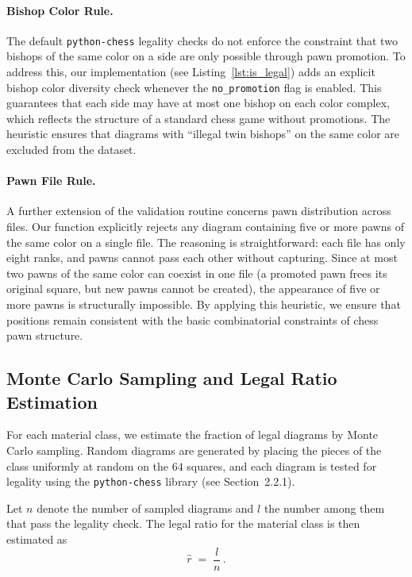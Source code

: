 \documentclass[12pt]{article}
\begin{document}
\paragraph{Bishop Color Rule.}
The default \texttt{python-chess} legality checks do not enforce the constraint that two bishops of the same color on a side are only possible through pawn promotion. 
To address this, our implementation (see Listing~\ref{lst:is_legal}) adds an explicit bishop color diversity check whenever the \texttt{no\_promotion} flag is enabled. 
This guarantees that each side may have at most one bishop on each color complex, which reflects the structure of a standard chess game without promotions. 
The heuristic ensures that diagrams with ``illegal twin bishops'' on the same color are excluded from the dataset.

\paragraph{Pawn File Rule.}
A further extension of the validation routine concerns pawn distribution across files. 
Our function explicitly rejects any diagram containing five or more pawns of the same color on a single file. 
The reasoning is straightforward: each file has only eight ranks, and pawns cannot pass each other without capturing. 
Since at most two pawns of the same color can coexist in one file (a promoted pawn frees its original square, but new pawns cannot be created), the appearance of five or more pawns is structurally impossible. 
By applying this heuristic, we ensure that positions remain consistent with the basic combinatorial constraints of chess pawn structure.

\subsection{Monte Carlo Sampling and Legal Ratio Estimation}

For each material class, we estimate the fraction of legal diagrams by Monte Carlo sampling. Random diagrams are generated by placing the pieces of the class uniformly at random on the $64$ squares, and each diagram is tested for legality using the \texttt{python-chess} library (see Section~2.2.1).

Let $n$ denote the number of sampled diagrams and $l$ the number among them that pass the legality check. The legal ratio for the material class is then estimated as
\begin{equation}
\hat{r} \;=\; \frac{l}{n}\, .
\end{equation}
\end{document}
